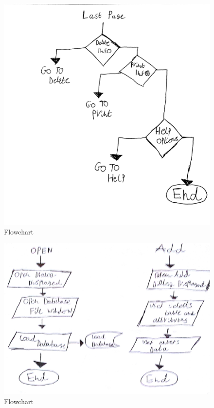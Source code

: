 \begin{figure}[H]
    \includegraphics[width=\textwidth]{flowchart4.jpg}
    \caption{Flowchart} \label{fig:Flowchart}
\end{figure}

\begin{figure}[H]
    \includegraphics[width=\textwidth]{flowchart3.jpg}
    \caption{Flowchart} \label{fig:Flowchart}
\end{figure}


